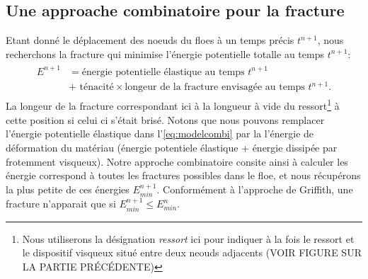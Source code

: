 




\subsection{Une approache combinatoire pour la fracture}
\label{subsubsec:approchecombi}


Etant donné le déplacement des noeuds du floes à un temps précis $t^{n+1}$, nous recherchons la fracture qui minimise l'énergie potentielle totalle au temps $t^{n+1}$:
\begin{align} \label{eq:modelcombi}
    \boxed{
    \begin{array}{rll}
    E^{n+1} & = \text{énergie potentielle élastique au temps } t^{n+1}  \\
    & + \text{ ténacité}\times \text{longeur de la fracture envisagée au temps }t^{n+1}.  
    \end{array}
    }
\end{align}
La longeur de la fracture correspondant ici à la longueur à vide du ressort\footnote{Nous utiliserons la désignation \emph{ressort} ici pour indiquer à la fois le ressort et le dispositif visqueux situé entre deux neouds adjacents (VOIR FIGURE SUR LA PARTIE PRÉCÉDENTE)} à cette position si celui ci s'était brisé. Notons que nous pouvons remplacer l'énergie potentielle élastique dans l'\cref{eq:modelcombi} par la l'énergie de déformation du matériau (énergie potentiele élastique + énergie dissipée par frotemment visqueux). Notre approche combinatoire consite ainsi à calculer les énergie correspond à toutes les fractures possibles dans le floe, et nous récupérons la plus petite de ces énergies $E^{n+1}_{min}$. Conformément à l'approche de Griffith, une fracture n'apparait que si $E^{n+1}_{min}\leq E^{n}_{min}$. 


